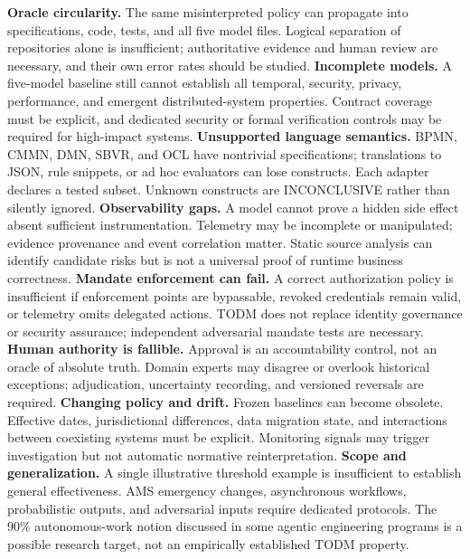 \documentclass[11pt,a4paper]{article}
\newcommand{\INC}{\textsf{INCONCLUSIVE}}
\begin{document}
\textbf{Oracle circularity.} The same misinterpreted policy can propagate into specifications, code, tests, and all five model files. Logical separation of repositories alone is insufficient; authoritative evidence and human review are necessary, and their own error rates should be studied.
\textbf{Incomplete models.} A five-model baseline still cannot establish all temporal, security, privacy, performance, and emergent distributed-system properties. Contract coverage must be explicit, and dedicated security or formal verification controls may be required for high-impact systems.
\textbf{Unsupported language semantics.} BPMN, CMMN, DMN, SBVR, and OCL have nontrivial specifications; translations to JSON, rule snippets, or ad hoc evaluators can lose constructs. Each adapter declares a tested subset. Unknown constructs are \INC{} rather than silently ignored.
\textbf{Observability gaps.} A model cannot prove a hidden side effect absent sufficient instrumentation. Telemetry may be incomplete or manipulated; evidence provenance and event correlation matter. Static source analysis can identify candidate risks but is not a universal proof of runtime business correctness.
\textbf{Mandate enforcement can fail.} A correct authorization policy is insufficient if enforcement points are bypassable, revoked credentials remain valid, or telemetry omits delegated actions. TODM does not replace identity governance or security assurance; independent adversarial mandate tests are necessary.
\textbf{Human authority is fallible.} Approval is an accountability control, not an oracle of absolute truth. Domain experts may disagree or overlook historical exceptions; adjudication, uncertainty recording, and versioned reversals are required.
\textbf{Changing policy and drift.} Frozen baselines can become obsolete. Effective dates, jurisdictional differences, data migration state, and interactions between coexisting systems must be explicit. Monitoring signals may trigger investigation but not automatic normative reinterpretation.
\textbf{Scope and generalization.} A single illustrative threshold example is insufficient to establish general effectiveness. AMS emergency changes, asynchronous workflows, probabilistic outputs, and adversarial inputs require dedicated protocols. The 90\% autonomous-work notion discussed in some agentic engineering programs is a possible research target, not an empirically established TODM property.
\end{document}
